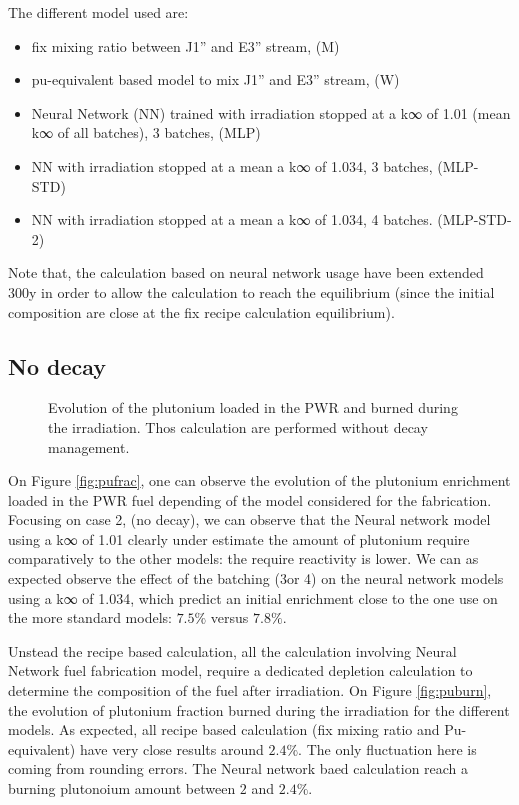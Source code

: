 \documentclass[10pt]{article}
\begin{document}
The different model used are:
\begin{itemize}
  \item fix mixing ratio between J1'' and E3'' stream, (M)
  \item	pu-equivalent based model to mix J1'' and E3'' stream, (W)
  \item	Neural Network (NN) trained with irradiation stopped at a k∞ of 1.01 (mean k∞ of all batches), 3 batches, (MLP)
  \item	NN with irradiation stopped at a mean a k∞ of 1.034, 3 batches, (MLP-STD)
  \item	NN with irradiation stopped at a mean a k∞ of 1.034, 4 batches. (MLP-STD-2)
\end{itemize}

Note that, the calculation based on neural network usage have been extended 300y
in order to allow the calculation to reach the equilibrium (since the initial
composition are close at the fix recipe calculation equilibrium).

\subsection{No decay}

\begin{figure}[h!]
    \centering
    \caption{Evolution of the plutonium loaded in the PWR and burned during the
      irradiation. Thos calculation are performed  without decay management.\label{fig:pu_nodecay} }
\end{figure}


On Figure \ref{fig:pufrac}, one can observe the evolution of the plutonium
enrichment loaded in the PWR fuel depending of the model considered for the
fabrication.
Focusing on case 2, (no decay), we can observe that the Neural network model
using a k∞ of 1.01 clearly under estimate the amount of plutonium require
comparatively to the other models: the require reactivity is lower. We can as
expected observe the effect of the batching (3or 4) on the neural network models
using a k∞ of 1.034, which predict an initial enrichment close to the one
use on the more standard models: $7.5\%$ versus $7.8\%$. 

Unstead the recipe based calculation, all the calculation involving Neural
Network fuel fabrication model, require a dedicated depletion calculation to
determine the composition of the fuel after irradiation. On Figure
\ref{fig:puburn}, the evolution of plutonium fraction burned during the
irradiation for the different models. As expected, all recipe based calculation
(fix mixing ratio and Pu-equivalent) have very close results around $2.4\%$. The only
fluctuation here is coming from rounding errors. The Neural network baed
calculation reach a burning plutonoium amount between $2$ and $2.4\%$.
\end{document}
